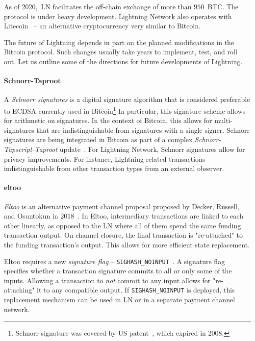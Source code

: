 As of 2020,~LN facilitates the off-chain exchange of more than $950$~BTC.
The protocol is under heavy development.
Lightning Network also operates with Litecoin~\cite{1MLLitecoin} -- an alternative cryptocurrency very similar to Bitcoin.

The future of Lightning depends in part on the planned modifications in the Bitcoin protocol.
Such changes usually take years to implement, test, and roll out.
Let us outline some of the directions for future developments of Lightning.

\paragraph{Schnorr-Taproot}

A \textit{Schnorr signatures} is a digital signature algorithm that is considered preferable to ECDSA currently used in Bitcoin\footnote{Schnorr signature was covered by US patent~\cite{Schnorr1989}, which expired in 2008.}
In particular, this signature scheme allows for arithmetic on signatures.
In the context of Bitcoin, this allows for multi-signatures that are indistinguishable from signatures with a single signer.
Schnorr signatures are being integrated in Bitcoin as part of a complex \textit{Schnorr-Tapscript-Taproot} update~\cite{Hertig2020}.
For Lightning Network, Schnorr signatures allow for privacy improvements.
For instance, Lightning-related transactions indistinguishable from other transaction types from an external observer.

\paragraph{eltoo}

\textit{Eltoo} is an alternative payment channel proposal proposed by Decker, Russell, and Osuntokun in 2018~\cite{Decker2018}.
In Eltoo, intermediary transactions are linked to each other linearly, as opposed to the LN where all of them spend the same funding transaction output.
On channel closure, the final transaction is "re-attached" to the funding transaction's output.
This allows for more efficient state replacement.

Eltoo requires a new \textit{signature flag} -- \texttt{SIGHASH\_NOINPUT}~\cite{Decker2017}.
A signature flag specifies whether a transaction signature commits to all or only some of the inputs.
Allowing a transaction to \textit{not} commit to any input allows for "re-attaching" it to any compatible output.
If \texttt{SIGHASH\_NOINPUT} is deployed, this replacement mechanism can be used in LN or in a separate payment channel network.

